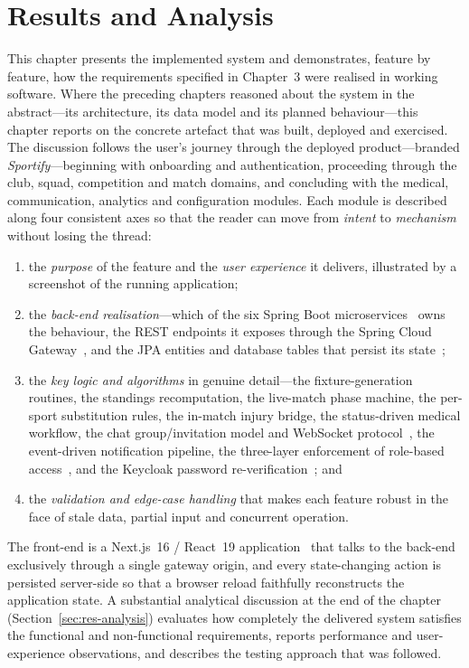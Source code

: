 \chapter{Results and Analysis}
\label{ch:results}

This chapter presents the implemented system and demonstrates, feature by feature,
how the requirements specified in Chapter~3 were realised in working software. Where
the preceding chapters reasoned about the system in the abstract---its architecture,
its data model and its planned behaviour---this chapter reports on the concrete
artefact that was built, deployed and exercised. The discussion follows the user's
journey through the deployed product---branded \textit{Sportify}---beginning with
onboarding and authentication, proceeding through the club, squad, competition and
match domains, and concluding with the medical, communication, analytics and
configuration modules. Each module is described along four consistent axes so that the
reader can move from \emph{intent} to \emph{mechanism} without losing the thread:
\begin{enumerate}
  \item the \emph{purpose} of the feature and the \emph{user experience} it delivers,
        illustrated by a screenshot of the running application;
  \item the \emph{back-end realisation}---which of the six Spring Boot
        microservices~\cite{springboot,microservices} owns the behaviour, the REST
        endpoints it exposes through the Spring Cloud Gateway~\cite{springcloud}, and
        the JPA entities and database tables that persist its state~\cite{postgres};
  \item the \emph{key logic and algorithms} in genuine detail---the fixture-generation
        routines, the standings recomputation, the live-match phase machine, the
        per-sport substitution rules, the in-match injury bridge, the status-driven
        medical workflow, the chat group/invitation model and WebSocket
        protocol~\cite{websocket}, the event-driven notification pipeline, the
        three-layer enforcement of role-based access~\cite{rbac}, and the Keycloak
        password re-verification~\cite{keycloak,jwt}; and
  \item the \emph{validation and edge-case handling} that makes each feature robust in
        the face of stale data, partial input and concurrent operation.
\end{enumerate}
The front-end is a Next.js~16 / React~19 application~\cite{nextjs,react} that talks to
the back-end exclusively through a single gateway origin, and every state-changing
action is persisted server-side so that a browser reload faithfully reconstructs the
application state. A substantial analytical discussion at the end of the chapter
(Section~\ref{sec:res-analysis}) evaluates how completely the delivered system
satisfies the functional and non-functional requirements, reports performance and
user-experience observations, and describes the testing approach that was followed.

